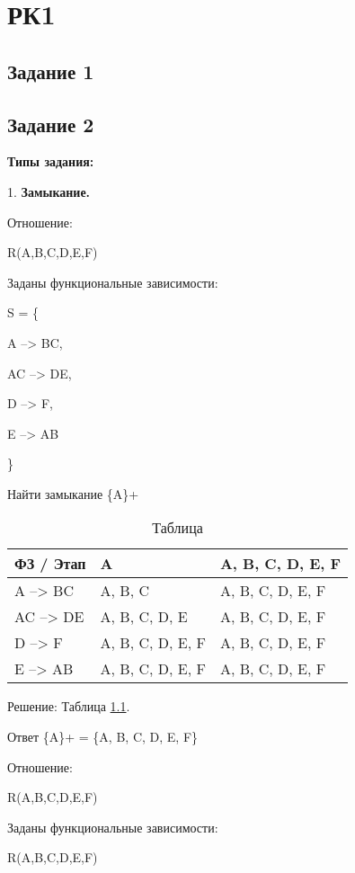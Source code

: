 \chapter{РК1}

\section{Задание 1}



\section{Задание 2}


\textbf{Типы задания:}

1. \textbf{Замыкание.}

Отношение:

R(A,B,C,D,E,F)

Заданы функциональные зависимости:

S = \{

A --> BC,

AC --> DE,

D --> F,

E --> AB

\}

Найти замыкание \{A\}+

\begin{table}[ht]
	\centering
	\begin{tabular}{ | l | l | l |}
		\hline
		ФЗ / Этап & A                & A, B, C, D, E, F \\ \hline
		A --> BC  & A, B, C          & A, B, C, D, E, F \\ \hline
		AC --> DE & A, B, C, D, E    & A, B, C, D, E, F \\ \hline
		D --> F   & A, B, C, D, E, F & A, B, C, D, E, F \\ \hline
		E --> AB  & A, B, C, D, E, F & A, B, C, D, E, F \\ \hline
		\hline
	\end{tabular}
	\caption{Таблица}
	\label{fig:ref11}
\end{table}

Решение: Таблица \ref{fig:ref11}.

Ответ \{A\}+ = \{A, B, C, D, E, F\}

Отношение:

R(A,B,C,D,E,F)

Заданы функциональные зависимости:

R(A,B,C,D,E,F)

